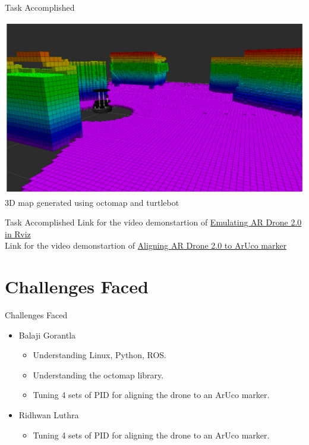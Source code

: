 \documentclass[10pt, a4paper]{beamer}
\begin{document}
\begin{frame}{Task Accomplished}
\begin{center}
\includegraphics[scale=0.8]{turtle}\\
		3D map generated using octomap and turtlebot
\end{center}
		
\end{frame}

\begin{frame}{Task Accomplished}
Link for the video demonstartion of 
\href{https://youtu.be/W7t_BQyy5vk}{Emulating AR Drone 2.0 in Rviz}\\
Link for the video demonstartion of \href{https://youtu.be/Q2GwBIR4_pk}{Aligning AR Drone 2.0 to ArUco marker}\\

\end{frame}

\section{Challenges Faced}
\begin{frame}{Challenges Faced}
	\begin{itemize}
		\item Balaji Gorantla
        \begin{itemize}
        	\item Understanding Linux, Python, ROS.
            \item Understanding the octomap library.
            \item Tuning 4 sets of PID for aligning the drone to an ArUco marker.
        \end{itemize}
        \item Ridhwan Luthra
        \begin{itemize}
            \item Tuning 4 sets of PID for aligning the drone to an ArUco marker.
        \end{itemize}
	\end{itemize}
\end{frame}
\end{document}
